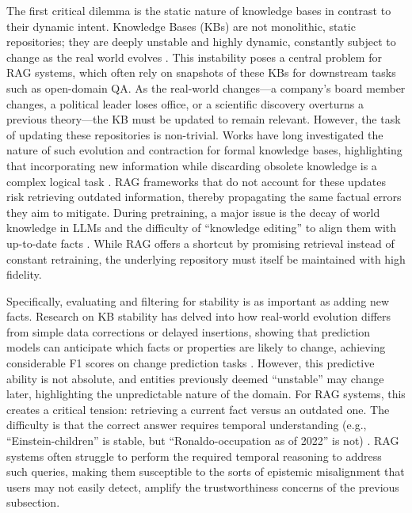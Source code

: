 \documentclass[11pt]{article}
\begin{document}
The first critical dilemma is the static nature of knowledge bases in contrast to their dynamic intent. Knowledge Bases (KBs) are not monolithic, static repositories; they are deeply unstable and highly dynamic, constantly subject to change as the real world evolves \cite{ref241}. This instability poses a central problem for RAG systems, which often rely on snapshots of these KBs for downstream tasks such as open-domain QA. As the real-world changes---a company's board member changes, a political leader loses office, or a scientific discovery overturns a previous theory---the KB must be updated to remain relevant. However, the task of updating these repositories is non-trivial. Works have long investigated the nature of such evolution and contraction for formal knowledge bases, highlighting that incorporating new information while discarding obsolete knowledge is a complex logical task \cite{ref242}. RAG frameworks that do not account for these updates risk retrieving outdated information, thereby propagating the same factual errors they aim to mitigate. During pretraining, a major issue is the decay of world knowledge in LLMs and the difficulty of ``knowledge editing'' to align them with up-to-date facts \cite{ref243}. While RAG offers a shortcut by promising retrieval instead of constant retraining, the underlying repository must itself be maintained with high fidelity.

Specifically, evaluating and filtering for stability is as important as adding new facts. Research on KB stability has delved into how real-world evolution differs from simple data corrections or delayed insertions, showing that prediction models can anticipate which facts or properties are likely to change, achieving considerable F1 scores on change prediction tasks \cite{ref241}. However, this predictive ability is not absolute, and entities previously deemed ``unstable'' may change later, highlighting the unpredictable nature of the domain. For RAG systems, this creates a critical tension: retrieving a current fact versus an outdated one. The difficulty is that the correct answer requires temporal understanding (e.g., ``Einstein-children'' is stable, but ``Ronaldo-occupation as of 2022'' is not) \cite{ref241}. RAG systems often struggle to perform the required temporal reasoning to address such queries, making them susceptible to the sorts of epistemic misalignment that users may not easily detect, amplify the trustworthiness concerns of the previous subsection.
\end{document}
